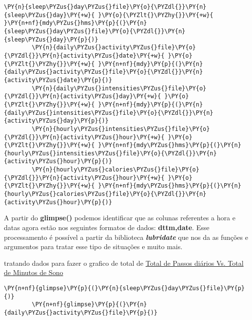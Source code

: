 \begin{tcolorbox}[breakable, size=fbox, boxrule=1pt, pad at break*=1mm,colback=cellbackground, colframe=cellborder]
    \begin{Verbatim}[commandchars=\\\{\}]
        \PY{n}{sleep\PYZus{}day\PYZus{}file}\PY{o}{\PYZdl{}}\PY{n}{sleep\PYZus{}day}\PY{+w}{ }\PY{o}{\PYZlt{}\PYZhy{}}\PY{+w}{ }\PY{n+nf}{mdy\PYZus{}hms}\PY{p}{(}\PY{n}{sleep\PYZus{}day\PYZus{}file}\PY{o}{\PYZdl{}}\PY{n}{sleep\PYZus{}day}\PY{p}{)}
        \PY{n}{daily\PYZus{}activity\PYZus{}file}\PY{o}{\PYZdl{}}\PY{n}{activity\PYZus{}date}\PY{+w}{ }\PY{o}{\PYZlt{}\PYZhy{}}\PY{+w}{ }\PY{n+nf}{mdy}\PY{p}{(}\PY{n}{daily\PYZus{}activity\PYZus{}file}\PY{o}{\PYZdl{}}\PY{n}{activity\PYZus{}date}\PY{p}{)}
        \PY{n}{daily\PYZus{}intensities\PYZus{}file}\PY{o}{\PYZdl{}}\PY{n}{activity\PYZus{}day}\PY{+w}{ }\PY{o}{\PYZlt{}\PYZhy{}}\PY{+w}{ }\PY{n+nf}{mdy}\PY{p}{(}\PY{n}{daily\PYZus{}intensities\PYZus{}file}\PY{o}{\PYZdl{}}\PY{n}{activity\PYZus{}day}\PY{p}{)}
        \PY{n}{hourly\PYZus{}intensities\PYZus{}file}\PY{o}{\PYZdl{}}\PY{n}{activity\PYZus{}hour}\PY{+w}{ }\PY{o}{\PYZlt{}\PYZhy{}}\PY{+w}{ }\PY{n+nf}{mdy\PYZus{}hms}\PY{p}{(}\PY{n}{hourly\PYZus{}intensities\PYZus{}file}\PY{o}{\PYZdl{}}\PY{n}{activity\PYZus{}hour}\PY{p}{)}
        \PY{n}{hourly\PYZus{}calories\PYZus{}file}\PY{o}{\PYZdl{}}\PY{n}{activity\PYZus{}hour}\PY{+w}{ }\PY{o}{\PYZlt{}\PYZhy{}}\PY{+w}{ }\PY{n+nf}{mdy\PYZus{}hms}\PY{p}{(}\PY{n}{hourly\PYZus{}calories\PYZus{}file}\PY{o}{\PYZdl{}}\PY{n}{activity\PYZus{}hour}\PY{p}{)}
    \end{Verbatim}
\end{tcolorbox}

A partir do \textbf{glimpse()} podemos identificar que as colunas
referentes a hora e datas agora estão nos seguintes formatos de dados:
\textbf{dttm,date}. Esse processamento é possível a partir da biblioteca
\textbf{\emph{lubridate}} que nos da as funções e argumentos para tratar
esse tipo de situações e muito mais.


tratando dados para fazer o grafico de total de
\hyperref[subsection4-four]{Total de Passos diários Vs. Total de Minutos de Sono}

\begin{tcolorbox}[breakable, size=fbox, boxrule=1pt, pad at break*=1mm,colback=cellbackground, colframe=cellborder]
    \begin{Verbatim}[commandchars=\\\{\}]
        \PY{n+nf}{glimpse}\PY{p}{(}\PY{n}{sleep\PYZus{}day\PYZus{}file}\PY{p}{)}
        \PY{n+nf}{glimpse}\PY{p}{(}\PY{n}{daily\PYZus{}activity\PYZus{}file}\PY{p}{)}
    \end{Verbatim}
\end{tcolorbox}

